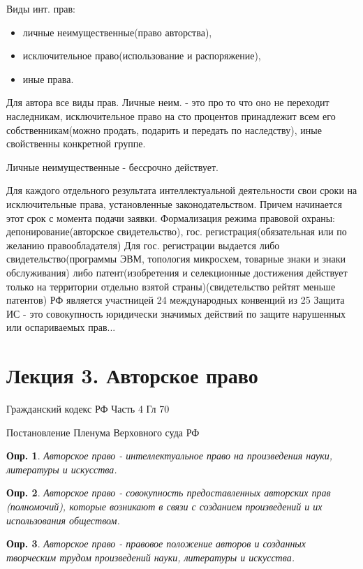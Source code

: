 \documentclass[12pt]{article}
\newtheorem{definition}{Опр.}
\begin{document}
Виды инт. прав: 
\begin{itemize}
\item личные неимущественные(право авторства), 
\item исключительное право(использование и распоряжение), 
\item иные права.
\end{itemize}

Для автора все виды прав. Личные неим. - это про то что оно не переходит наследникам, исключительное право на сто процентов принадлежит всем его собственникам(можно продать, подарить и передать по наследству), иные свойственны конкретной группе.

Личные неимущественные - бессрочно действует.

Для каждого отдельного результата интеллектуальной деятельности свои сроки на исключительные права, установленные законодательством. Причем начинается этот срок с момента подачи заявки.
	Формализация режима правовой охраны: депонирование(авторское свидетельство), гос. регистрация(обязательная или по желанию правообладателя)
	Для гос. регистрации выдается либо свидетельство(программы ЭВМ, топология микросхем, товарные знаки и знаки обслуживания) либо патент(изобретения и селекционные достижения действует только на территории отдельно взятой страны)(свидетельство рейтят меньше патентов)
	РФ является участницей 24 международных конвенций из 25
	Защита ИС - это совокупность юридически значимых действий по защите нарушенных или оспариваемых прав...

\section{Лекция 3. Авторское право}

Гражданский кодекс РФ Часть 4 Гл 70

Постановление Пленума Верховного суда РФ 

\begin{definition}
Авторское право  - интеллектуальное право на произведения 
науки, литературы и искусства.
\end{definition}

\begin{definition}
Авторское право - совокупность предоставленных авторских прав 
(полномочий), которые возникают в связи с созданием 
произведений и их использования обществом.
\end{definition}

\begin{definition}
Авторское право - правовое положение авторов и созданных 
творческим трудом произведений науки, литературы и искусства.
\end{definition}
\end{document}
